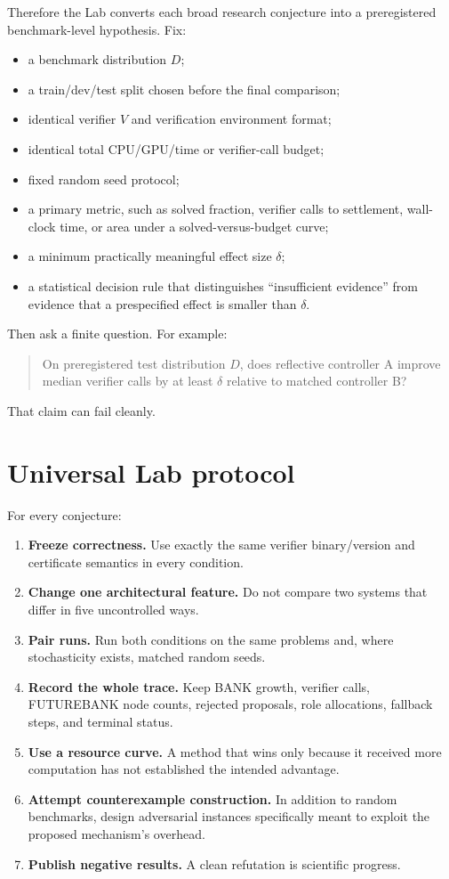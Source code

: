 \documentclass[11pt,openany]{book}
\theoremstyle{definition}
\theoremstyle{remark}
\begin{document}
Therefore the Lab converts each broad research conjecture into a preregistered benchmark-level hypothesis. Fix:
\begin{itemize}
\item a benchmark distribution $D$;
\item a train/dev/test split chosen before the final comparison;
\item identical verifier $V$ and verification environment format;
\item identical total CPU/GPU/time or verifier-call budget;
\item fixed random seed protocol;
\item a primary metric, such as solved fraction, verifier calls to settlement, wall-clock time, or area under a solved-versus-budget curve;
\item a minimum practically meaningful effect size $\delta$;
\item a statistical decision rule that distinguishes ``insufficient evidence'' from evidence that a prespecified effect is smaller than $\delta$.
\end{itemize}
Then ask a finite question. For example:
\begin{quote}
On preregistered test distribution $D$, does reflective controller A improve median verifier calls by at least $\delta$ relative to matched controller B?
\end{quote}
That claim can fail cleanly.

\section{Universal Lab protocol}
For every conjecture:
\begin{enumerate}
\item \textbf{Freeze correctness.} Use exactly the same verifier binary/version and certificate semantics in every condition.
\item \textbf{Change one architectural feature.} Do not compare two systems that differ in five uncontrolled ways.
\item \textbf{Pair runs.} Run both conditions on the same problems and, where stochasticity exists, matched random seeds.
\item \textbf{Record the whole trace.} Keep BANK growth, verifier calls, FUTUREBANK node counts, rejected proposals, role allocations, fallback steps, and terminal status.
\item \textbf{Use a resource curve.} A method that wins only because it received more computation has not established the intended advantage.
\item \textbf{Attempt counterexample construction.} In addition to random benchmarks, design adversarial instances specifically meant to exploit the proposed mechanism's overhead.
\item \textbf{Publish negative results.} A clean refutation is scientific progress.
\end{enumerate}
\end{document}
